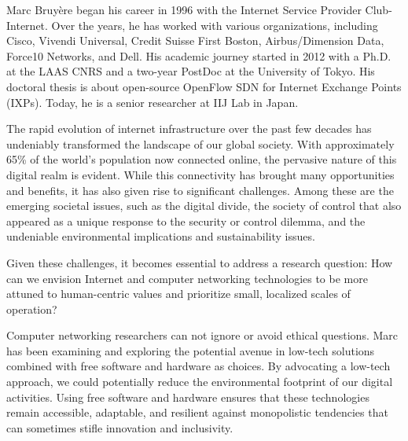 \documentclass[journal]{IEEEtran}
\begin{document}
\begin{IEEEbiographynophoto}{Marc Bruyère}
began  his  career  in 1996  with  the Internet  Service
Provider Club-Internet.  Over the  years, he  has worked  with various
organizations, including Cisco, Vivendi Universal, Credit Suisse First
Boston,  Airbus/Dimension  Data,  Force10   Networks,  and  Dell.  His
academic journey started in  2012 with a Ph.D. at the  LAAS CNRS and a
two-year PostDoc  at the University  of Tokyo. His doctoral  thesis is
about   open-source  OpenFlow   SDN  for   Internet  Exchange   Points
(IXPs). Today, he is a senior researcher at IIJ Lab in Japan.

The  rapid evolution  of  internet infrastructure  over  the past  few
decades  has  undeniably  transformed  the  landscape  of  our  global
society.  With  approximately  65\%  of  the  world’s  population  now
connected  online,  the pervasive  nature  of  this digital  realm  is
evident.  While  this connectivity has brought  many opportunities and
benefits,  it has  also given  rise to  significant challenges.  Among
these are  the emerging societal  issues, such as the  digital divide,
the society of control that also  appeared as a unique response to the
security  or   control  dilemma,  and  the   undeniable  environmental
implications and sustainability issues.

Given these  challenges, it  becomes essential  to address  a research
question:  How  can  we  envision  Internet  and  computer  networking
technologies to be more attuned to human-centric values and prioritize
small, localized scales of operation?

Computer  networking  researchers  can  not ignore  or  avoid  ethical
questions. Marc has been examining  and exploring the potential avenue
in  low-tech solutions  combined with  free software  and hardware  as
choices.  By  advocating a  low-tech  approach,  we could  potentially
reduce the  environmental footprint  of our digital  activities. Using
free  software and  hardware  ensures that  these technologies  remain
accessible, adaptable,  and resilient against  monopolistic tendencies
that can sometimes stifle innovation and inclusivity.
\end{IEEEbiographynophoto}
\end{document}

